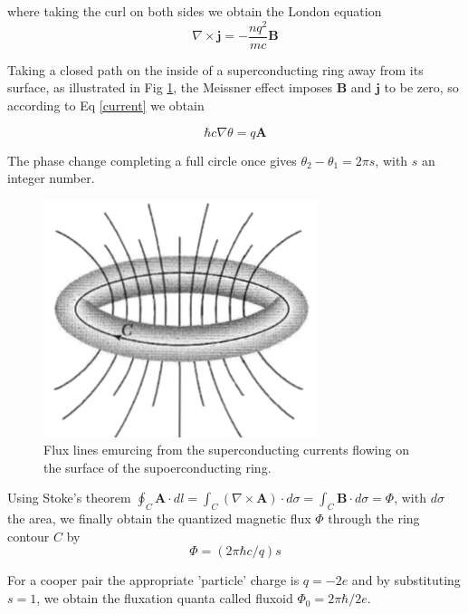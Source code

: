 \documentclass[openany,11pt,a4paper]{report}
\begin{document}
where taking the curl on both sides we obtain the London equation
\begin{equation}
\nabla \times \mathbf{j}=-\frac{n q^{2}}{m c} \mathbf{B}
\end{equation}

Taking a closed path on the inside of a superconducting ring away from its surface, as illustrated in Fig \ref{Fig:ring}, the Meissner effect imposes $\textbf{B}$ and $\textbf{j}$ to be zero, so according to Eq \ref{current} we obtain 

\begin{equation}
\hbar c \nabla \theta = q\textbf{A}
\end{equation}


The phase change completing a full circle once gives $\theta_{2}-\theta_{1}=2 \pi s$, with $s$ an integer number.

\begin{figure}[H]
\centering
\includegraphics[scale=0.60]{ring.png}   
\caption{Flux lines emurcing from the superconducting currents flowing on the surface of the supoerconducting ring. \cite{kittel}}
\label{Fig:ring}
\end{figure}
 


Using Stoke's theorem $
\oint_{C} \mathbf{A} \cdot d l=\int_{C}(\nabla \times \mathbf{A}) \cdot d \sigma=\int_{C} \mathbf{B} \cdot d \sigma=\Phi$, with $d\sigma$ the area, we finally obtain the quantized magnetic flux $\Phi$ through the ring contour $C$ by
\begin{equation}
\Phi=(2 \pi \hbar c / q) s
\end{equation}

For a cooper pair the appropriate 'particle' charge is $q=-2e$ and by substituting $s=1$, we obtain the fluxation quanta called fluxoid $\Phi_{0}=2 \pi \hbar / 2e  $.
\end{document}
